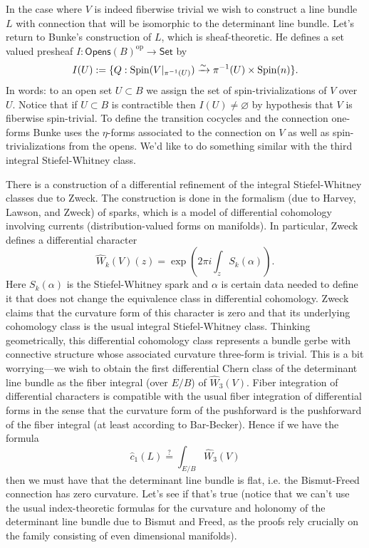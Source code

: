 \documentclass{amsart}
\newcommand{\op}{\text{op}}
\begin{document}
In the case where $V$ is indeed fiberwise trivial we wish to construct a line bundle
$L$ with connection that will be isomorphic to the determinant line bundle. Let's
return to Bunke's construction of $L$, which is sheaf-theoretic. He defines a
set valued presheaf $I:\mathsf{Opens}(B)^\op\to\mathsf{Set}$ by
\begin{equation*}
    I(U) := \{Q:\operatorname{Spin}(V|_{\pi^{-1}(U)}) \xrightarrow{\sim} \pi^{-1}(U) \times\operatorname{Spin}(n)\}.
\end{equation*}
In words: to an open set $U\subset B$ we assign the set of spin-trivializations
of $V$ over $U$. Notice that if $U\subset B$ is contractible then $I(U)\neq\varnothing$
by hypothesis that $V$ is fiberwise spin-trivial. To define the transition
cocycles and the connection one-forms Bunke uses the $\eta$-forms associated
to the connection on $V$ as well as spin-trivializations from the opens.
We'd like to do something similar with the third integral Stiefel-Whitney class.

There is a construction of a differential refinement of the integral Stiefel-Whitney
classes due to Zweck. The construction is done in the formalism (due to Harvey, Lawson,
and Zweck) of sparks, which is a model of differential cohomology involving
currents (distribution-valued forms on manifolds). In particular, Zweck
defines a differential character
\begin{equation*}
    \hat W_k(V)(z) = \exp(2\pi i\int_z S_k(\alpha)).
\end{equation*}
Here $S_k(\alpha)$ is the Stiefel-Whitney spark and $\alpha$ is certain data
needed to define it that does not change the equivalence class in differential
cohomology. Zweck claims that the curvature form of this character is
zero and that its underlying cohomology class is the usual integral Stiefel-Whitney
class. Thinking geometrically, this differential cohomology class represents
a bundle gerbe with connective structure whose associated curvature three-form
is trivial. This is a bit worrying---we wish to obtain the first differential
Chern class of the determinant line bundle as the fiber integral (over $E/B$)
of $\hat W_3(V)$. Fiber integration of differential characters is compatible
with the usual fiber integration of differential forms in the sense that
the curvature form of the pushforward is the pushforward of the fiber integral
(at least according to Bar-Becker). Hence if we have the formula
\begin{equation*}
    \hat c_1(L) \overset{?}{=} \int_{E/B} \hat W_3(V)
\end{equation*}
then we must have that the determinant line bundle is flat, i.e. the Bismut-Freed
connection has zero curvature. Let's see if that's true (notice that we can't
use the usual index-theoretic formulas for the curvature and holonomy of the
determinant line bundle due to Bismut and Freed, as the proofs rely crucially
on the family consisting of even dimensional manifolds).
\end{document}

